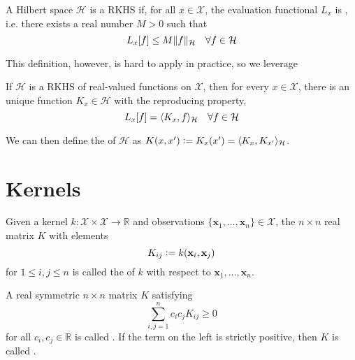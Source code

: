 \begin{definition}
A Hilbert space $\mathcal{H}$ is a RKHS if, for all $x \in \mathcal{X}$, the evaluation functional $L_x$ is , i.e. there exists a real number $M > 0$ such that 
\begin{equation}
  L_x[f] \leq M \lVert f\rVert_\mathcal{H} \quad \forall f \in \mathcal{H}
\end{equation}
\end{definition}

This definition, however, is hard to apply in practice, so we leverage 

\begin{theorem}
If $\mathcal{H}$ is a RKHS of real-valued functions on $\mathcal{X}$, then for every $x \in \mathcal{X}$, there is an unique function $K_x \in \mathcal{H}$ with the reproducing property,
\begin{equation}
  L_x[f] = \langle K_x, f\rangle_\mathcal{H} \quad \forall f \in \mathcal{H}
\end{equation}
\end{theorem}

We can then define the  of $\mathcal{H}$ as $K(x, x^\prime) \vcentcolon= K_x(x^\prime) = \langle K_x, K_{x^\prime}\rangle_\mathcal{H}$.

\section{Kernels}

\begin{definition}
Given a kernel $k : \mathcal{X} \times \mathcal{X} \to \mathbb{R}$ and observations $\{ \mathbf{x}_1, \dotsc, \mathbf{x}_n \} \in \mathcal{X}$, the $n \times n$ real matrix $K$ with elements
\begin{equation}
	K_{ij} \vcentcolon= k(\mathbf{x}_i, \mathbf{x}_j)
\end{equation}
for $1 \leq i, j \leq n$ is called the  of $k$ with respect to $\mathbf{x}_1, \dotsc, \mathbf{x}_n$.
\end{definition}

\begin{definition}
A real symmetric $n \times n$ matrix $K$ satisfying
\begin{equation}
	\sum_{i, j=1}^n c_i c_j K_{ij} \geq 0
\end{equation}
for all $c_i, c_j \in \mathbb{R}$ is called . If the term on the left is strictly positive, then $K$ is called .
\end{definition}

